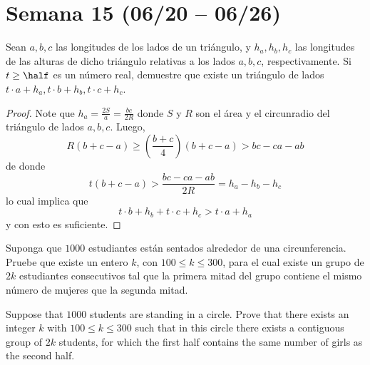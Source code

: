 \section{Semana 15 (06/20 -- 06/26)}


\begin{probEG}
  Sean $a,b,c$ las longitudes de los lados de un triángulo, y $h_a,h_b,h_c$ las
  longitudes de las alturas de dicho triángulo relativas a los lados $a,b,c$,
  respectivamente. Si $t\ge\half$ es un número real, demuestre que existe un
  triángulo de lados $t\cdot a+h_a,t\cdot b+h_b,t\cdot c+h_c$.
\end{probEG}

\begin{proof}
  Note que $h_a=\frac{2S}{a}=\frac{bc}{2R}$ donde $S$ y $R$ son el área y el
  circunradio del triángulo de lados $a,b,c$. Luego,
  \[R(b+c-a)\ge\left(\frac{b+c}{4}\right)(b+c-a)>bc-ca-ab\]
  de donde
  \[t(b+c-a)>\frac{bc-ca-ab}{2R}=h_a-h_b-h_c\]
  lo cual implica que
  \[t\cdot b+h_b+t\cdot c+h_c>t\cdot a+h_a\]
  y con esto es suficiente.
\end{proof}

\note[Combinatoria]{}

\begin{probEG}[ISL 2011/C2]
  Suponga que $1000$ estudiantes están sentados alrededor de una circunferencia.
  Pruebe que existe un entero $k$, con $100\le k\le 300$, para el cual existe un
  grupo de $2k$ estudiantes consecutivos tal que la primera mitad del grupo
  contiene el mismo número de mujeres que la segunda mitad.
  \begin{hint}
    Suppose that $1000$ students are standing in a circle. Prove that there
    exists an integer $k$ with $100\le k\le 300$ such that in this circle there
    exists a contiguous group of $2k$ students, for which the first half
    contains the same number of girls as the second half.
  \end{hint}
\end{probEG}

